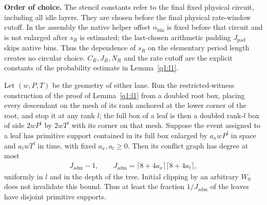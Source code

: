 \textbf{Order of choice.} The stencil constants refer to the final fixed physical circuit, including all idle layers. They are chosen before the final physical rate-window cutoff. In the assembly the native helper offset \(n_{\mathrm{bin}}\) is fixed before that circuit and is not enlarged after \(s_{R}\) is estimated; the last-chosen arithmetic padding \(J_{\mathrm{pad}}\) skips native bins. Thus the dependence of \(s_{R}\) on the elementary period length creates no circular choice. \(C_{R}, J_{R}, N_{R}\) and the rate cutoff are the explicit constants of the probability estimate in Lemma~\ref{q1:l1}.

\begin{lemma}\label{q1:l1.2}

Let \((w,P,T)\) be the geometry of either lane. Run the restricted-witness construction of the proof of Lemma~\ref{q1:l1} from a doubled root box, placing every descendant on the mesh of its rank anchored at the lower corner of the root, and stop it at any rank \(l\); the full box of a leaf is then a doubled rank-\(l\) box of side \(2wP^{l}\) by \(2wT^{l}\) with its corner on that mesh. Suppose the event assigned to a leaf has primitive support contained in its full box enlarged by \(a_{x}wP^{l}\) in space and \(a_{t}wT^{l}\) in time, with fixed \(a_{x},a_{t}\ge 0\). Then its conflict graph has degree at most
\[
\begin{gathered}
J_{\mathrm{adm}}-1,\qquad J_{\mathrm{adm}} = \lceil 8+4a_{x}\rceil \lceil 8+4a_{t}\rceil,
\end{gathered}
\]
uniformly in \(l\) and in the depth of the tree. Initial clipping by an arbitrary \(W_0\) does not invalidate this bound. Thus at least the fraction \(1/J_{\mathrm{adm}}\) of the leaves have disjoint primitive supports.

\end{lemma}
